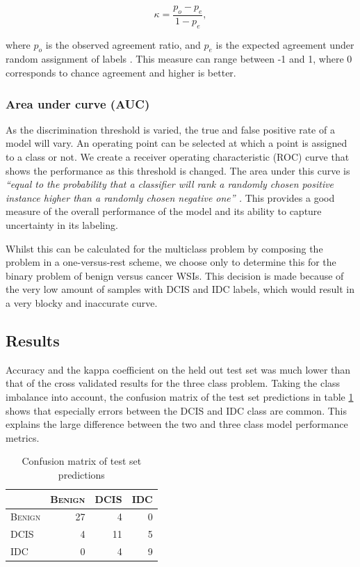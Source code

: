 \documentclass[journal]{IEEEtran}
\begin{document}
$$\kappa = \frac{p_o-p_e}{1-p_e},$$

where $p_o$ is the observed agreement ratio, and $p_e$ is the expected agreement under random assignment of labels \cite{artstein2008inter}. This measure can range between -1 and 1, where 0 corresponds to chance agreement and higher is better.

\subsubsection{Area under curve (AUC)}
As the discrimination threshold is varied, the true and false positive rate of a model will vary. An operating point can be selected at which a point is assigned to a class or not. We create a receiver operating characteristic (ROC) curve that shows the performance as this threshold is changed. The area under this curve is \textit{``equal to the probability that a classifier will rank a randomly chosen positive instance higher than a randomly chosen negative one'' \cite{Fawcett:2006:IRA:1159473.1159475}.} This provides a good measure of the overall performance of the model and its ability to capture uncertainty in its labeling.

Whilst this can be calculated for the multiclass problem by composing the problem in a one-versus-rest scheme, we choose only to determine this for the binary problem of benign versus cancer WSIs. This decision is made because of the very low amount of samples with DCIS and IDC labels, which would result in a very blocky and inaccurate curve.

\subsection{Results}


Accuracy and the kappa coefficient on the held out test set was much lower than that of the cross validated results for the three class problem. Taking the class imbalance into account, the confusion matrix of the test set predictions in table \ref{table_confusion_test} shows that especially errors between the DCIS and IDC class are common. This explains the large difference between the two and three class model performance metrics.

\begin{table}[h]
\renewcommand{\arraystretch}{1.21}
\caption{Confusion matrix of test set predictions}
\label{table_confusion_test}
\centering
\begin{tabular}{|l|rrr|}
\hline
\textsc{}&\textsc{Benign}&\textsc{DCIS}&\textsc{IDC}\\
\hline
\textsc{Benign}&27&4&0\\
\textsc{DCIS}&4& 11&5\\
\textsc{IDC}&0& 4&9\\
\hline

\end{tabular}
\end{table}
\end{document}
